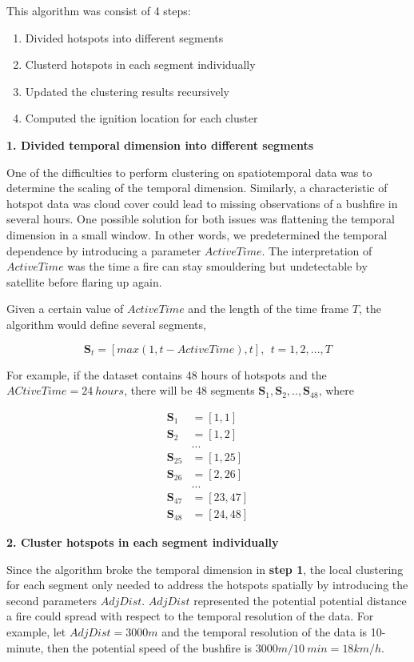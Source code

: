 This algorithm was consist of 4 steps:

\begin{enumerate}
\def\labelenumi{\arabic{enumi}.}
\tightlist
\item
  Divided hotspots into different segments
\item
  Clusterd hotspots in each segment individually
\item
  Updated the clustering results recursively
\item
  Computed the ignition location for each cluster
\end{enumerate}

\textbf{1. Divided temporal dimension into different segments}

One of the difficulties to perform clustering on spatiotemporal data was
to determine the scaling of the temporal dimension. Similarly, a
characteristic of hotspot data was cloud cover could lead to missing
observations of a bushfire in several hours. One possible solution for
both issues was flattening the temporal dimension in a small window. In
other words, we predetermined the temporal dependence by introducing a
parameter \(ActiveTime\). The interpretation of \(ActiveTime\) was the
time a fire can stay smouldering but undetectable by satellite before
flaring up again.

Given a certain value of \(ActiveTime\) and the length of the time frame
\(T\), the algorithm would define several segments,

\[\boldsymbol{S}_t = [max(1,t-ActiveTime),t],~~t = 1,2,...,T\]

For example, if the dataset contains 48 hours of hotspots and the
\(ACtiveTime = 24~hours\), there will be 48 segments
\(\boldsymbol{S}_1,\boldsymbol{S}_2,..,\boldsymbol{S}_{48}\), where

\begin{align*}
\boldsymbol{S}_1 &= [1,1]\\
\boldsymbol{S}_2 &= [1,2]\\
&...\\
\boldsymbol{S}_{25} &= [1,25]\\
\boldsymbol{S}_{26} &= [2,26]\\
&...\\
\boldsymbol{S}_{47} &= [23,47]\\
\boldsymbol{S}_{48} &= [24,48]
\end{align*}

\textbf{2. Cluster hotspots in each segment individually}

Since the algorithm broke the temporal dimension in \textbf{step 1}, the
local clustering for each segment only needed to address the hotspots
spatially by introducing the second parameters \(AdjDist\). \(AdjDist\)
represented the potential potential distance a fire could spread with
respect to the temporal resolution of the data. For example, let
\(AdjDist = 3000 m\) and the temporal resolution of the data is
10-minute, then the potential speed of the bushfire is
\(3000m/10~min = 18km/h\).

